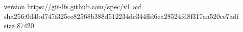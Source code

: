 version https://git-lfs.github.com/spec/v1
oid sha256:0d4bd747f325ee82568b388d512234dc344ffd6ea28524fd8f317aa520ce7adf
size 87420
